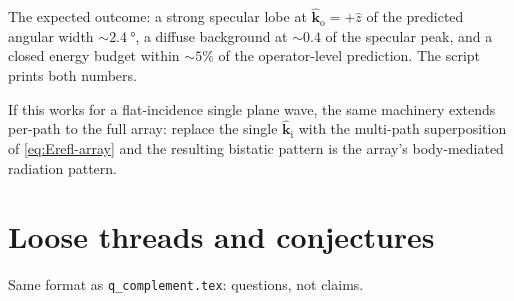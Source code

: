 \documentclass[11pt,a4paper]{article}
\theoremstyle{definition}
\newcommand{\kin}{\hat{\bm{k}}_{\mathrm{i}}}
\newcommand{\kout}{\hat{\bm{k}}_{\mathrm{o}}}
\begin{document}
The expected outcome: a strong specular lobe at $\kout=+\hat z$ of
the predicted angular width $\sim\SI{2.4}{\degree}$, a diffuse
background at $\sim 0.4$ of the specular peak, and a closed
energy budget within $\sim 5\%$ of the operator-level prediction.
The script prints both numbers.

If this works for a flat-incidence single plane wave, the same
machinery extends per-path to the full array: replace the single
$\kin$ with the multi-path superposition of \cref{eq:Erefl-array} and
the resulting bistatic pattern is the array's body-mediated radiation
pattern.

\section{Loose threads and conjectures}\label{sec:threads}

Same format as \texttt{q\_complement.tex}: questions, not claims.
\end{document}
